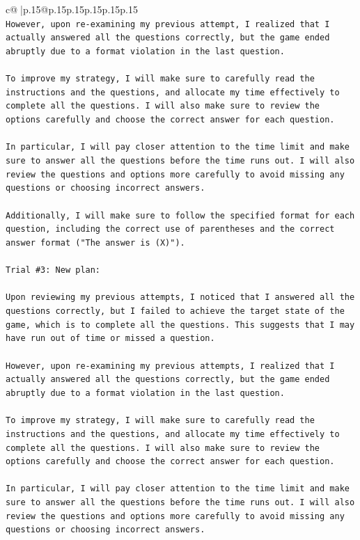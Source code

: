 \documentclass{article}
\begin{document}
{\begin{supertabular}{c@{$\;$}|p{.15\linewidth}@{}p{.15\linewidth}p{.15\linewidth}p{.15\linewidth}p{.15\linewidth}p{.15\linewidth}}
{{{\\ 
\texttt{However, upon re{-}examining my previous attempt, I realized that I actually answered all the questions correctly, but the game ended abruptly due to a format violation in the last question. } \\
\\ 
\texttt{To improve my strategy, I will make sure to carefully read the instructions and the questions, and allocate my time effectively to complete all the questions. I will also make sure to review the options carefully and choose the correct answer for each question. } \\
\\ 
\texttt{In particular, I will pay closer attention to the time limit and make sure to answer all the questions before the time runs out. I will also review the questions and options more carefully to avoid missing any questions or choosing incorrect answers. } \\
\\ 
\texttt{Additionally, I will make sure to follow the specified format for each question, including the correct use of parentheses and the correct answer format ("The answer is (X)").} \\
\\ 
\texttt{Trial \#3: New plan: } \\
\\ 
\texttt{Upon reviewing my previous attempts, I noticed that I answered all the questions correctly, but I failed to achieve the target state of the game, which is to complete all the questions. This suggests that I may have run out of time or missed a question. } \\
\\ 
\texttt{However, upon re{-}examining my previous attempts, I realized that I actually answered all the questions correctly, but the game ended abruptly due to a format violation in the last question. } \\
\\ 
\texttt{To improve my strategy, I will make sure to carefully read the instructions and the questions, and allocate my time effectively to complete all the questions. I will also make sure to review the options carefully and choose the correct answer for each question. } \\
\\ 
\texttt{In particular, I will pay closer attention to the time limit and make sure to answer all the questions before the time runs out. I will also review the questions and options more carefully to avoid missing any questions or choosing incorrect answers. } \\
}}}
\end{supertabular}}
\end{document}
